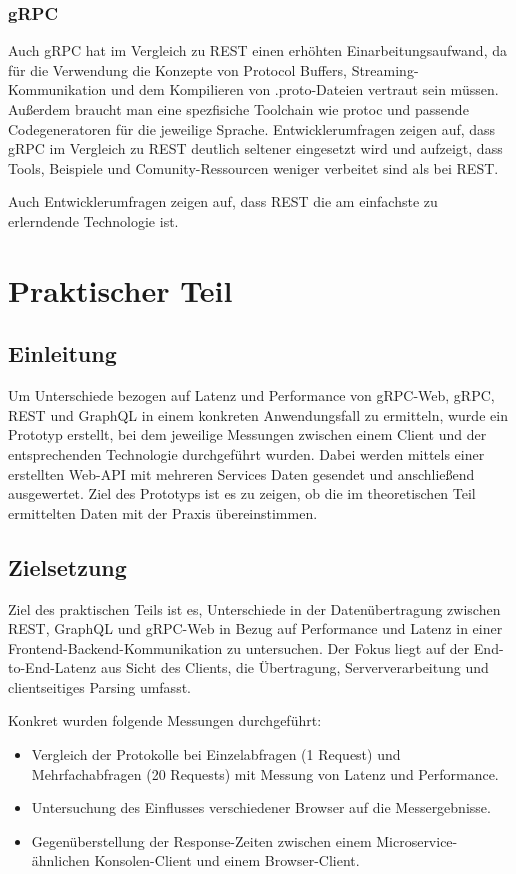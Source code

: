 \subsubsection{gRPC}
Auch gRPC hat im Vergleich zu REST einen erhöhten Einarbeitungsaufwand, da für die Verwendung die Konzepte von Protocol Buffers, Streaming-Kommunikation und dem Kompilieren von .proto-Dateien vertraut sein müssen. Außerdem braucht man eine spezfisiche Toolchain wie protoc und passende Codegeneratoren für die jeweilige Sprache. Entwicklerumfragen  zeigen auf, dass gRPC im Vergleich zu REST deutlich seltener eingesetzt wird und aufzeigt, dass Tools, Beispiele und Comunity-Ressourcen weniger verbeitet sind als bei REST.

Auch Entwicklerumfragen zeigen auf, dass REST die am einfachste zu erlerndende Technologie ist. 

\clearpage
\section{Praktischer Teil}
\subsection{Einleitung}
Um Unterschiede bezogen auf Latenz und Performance von gRPC-Web, gRPC, REST und GraphQL in einem konkreten Anwendungsfall zu ermitteln, wurde ein Prototyp erstellt, bei dem jeweilige Messungen zwischen einem Client und der entsprechenden Technologie durchgeführt wurden.
Dabei werden mittels einer erstellten Web-API mit mehreren Services Daten gesendet und anschließend ausgewertet.
Ziel des Prototyps ist es zu zeigen, ob die im theoretischen Teil ermittelten Daten mit der Praxis übereinstimmen.

\subsection{Zielsetzung}
Ziel des praktischen Teils ist es, Unterschiede in der Datenübertragung zwischen REST, GraphQL und gRPC-Web in Bezug auf Performance und Latenz in einer Frontend-Backend-Kommunikation zu untersuchen.
Der Fokus liegt auf der End-to-End-Latenz aus Sicht des Clients, die Übertragung, Serververarbeitung und clientseitiges Parsing umfasst.

Konkret wurden folgende Messungen durchgeführt:
\begin{itemize}
	\item Vergleich der Protokolle bei Einzelabfragen (1 Request) und Mehrfachabfragen (20 Requests) mit Messung von Latenz und Performance.
	\item Untersuchung des Einflusses verschiedener Browser auf die Messergebnisse.
	\item Gegenüberstellung der Response-Zeiten zwischen einem Microservice-ähnlichen Konsolen-Client und einem Browser-Client.
\end{itemize}

